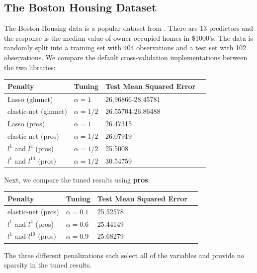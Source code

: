 \documentclass[article]{jss}
\numberwithin{equation}{section}
\begin{document}
\subsection{The Boston Housing Dataset}

The Boston Housing data is a popular dataset from \cite{boston_housing}.
There are 13 predictors and the response is the median value of owner-occupied homes in \$1000's. 
The data is randomly split into a training set with 404 observations and a test set with 102 observations.
We compare the default cross-validation implementations between the two libraries:

\begin{center}
\setlength{\tabcolsep}{20pt} %
\renewcommand{\arraystretch}{1} %
\begin{tabular}{lllp{7.4cm}}
\hline
Penalty & Tuning & Test Mean Squared Error \\ \hline
Lasso (glmnet) & $\alpha = 1$ & 26.96866-28.45781 \\
elastic-net (glmnet) & $\alpha = 1/2$  & 26.55704-26.86488   \\
Lasso (pros) & $\alpha = 1$ &  26.47315 \\
elastic-net (pros) & $\alpha = 1/2$ &  26.07919 \\
$l^1$ and $l^{4}$ (pros) & $\alpha = 1/2$ &  25.5008 \\
$l^1$ and $l^{10}$ (pros) & $\alpha = 1/2$ &  30.54759 \\ \hline
\end{tabular}
\end{center}

Next, we compare the tuned results using \textbf{pros}:

\begin{center}
\setlength{\tabcolsep}{20pt} %
\renewcommand{\arraystretch}{1} %
\begin{tabular}{lllp{7.4cm}}
\hline
Penalty & Tuning & Test Mean Squared Error \\ \hline
elastic-net (pros) & $\alpha = 0.1$ & 25.52578 \\
$l^1$ and $l^{4}$ (pros) & $\alpha = 0.6$ &  25.44149 \\
$l^1$ and $l^{10}$ (pros) & $\alpha = 0.9$ &  25.68279 \\ \hline
\end{tabular}
\end{center}

The three different penalizations each select all of the variables and provide no sparsity in the tuned results.
\end{document}
